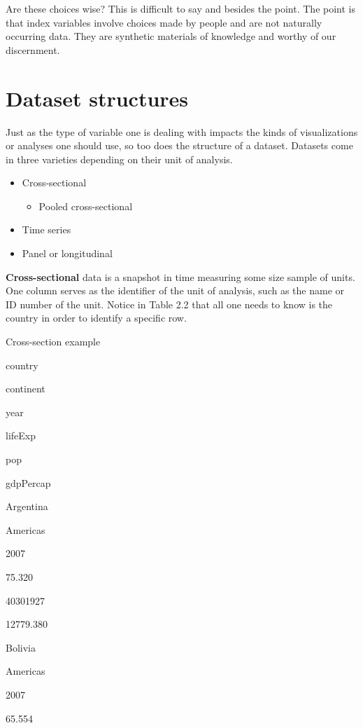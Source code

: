 \documentclass[
]{book}
\providecommand{\tightlist}{%
  \setlength{\itemsep}{0pt}\setlength{\parskip}{0pt}}
\begin{document}
Are these choices wise? This is difficult to say and besides the point. The point is that index variables involve choices made by people and are not naturally occurring data. They are synthetic materials of knowledge and worthy of our discernment.

\hypertarget{dataset-structures}{%
\section{Dataset structures}\label{dataset-structures}}

Just as the type of variable one is dealing with impacts the kinds of visualizations or analyses one should use, so too does the structure of a dataset. Datasets come in three varieties depending on their unit of analysis.

\begin{itemize}
\tightlist
\item
  Cross-sectional

  \begin{itemize}
  \tightlist
  \item
    Pooled cross-sectional
  \end{itemize}
\item
  Time series
\item
  Panel or longitudinal
\end{itemize}

\textbf{Cross-sectional} data is a snapshot in time measuring some size sample of units. One column serves as the identifier of the unit of analysis, such as the name or ID number of the unit. Notice in Table 2.2 that all one needs to know is the country in order to identify a specific row.

\label{tab:cross-sec-fig}Cross-section example

country

continent

year

lifeExp

pop

gdpPercap

Argentina

Americas

2007

75.320

40301927

12779.380

Bolivia

Americas

2007

65.554
\end{document}
